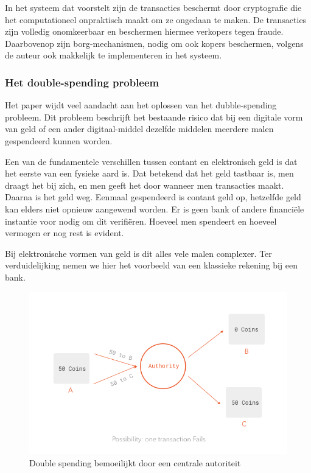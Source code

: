 			In het systeem dat \textcite{Nakamoto2008} voorstelt zijn de transacties beschermt door cryptografie die het computationeel onpraktisch maakt om ze ongedaan te maken. De transacties zijn volledig onomkeerbaar en beschermen hiermee verkopers tegen fraude. Daarbovenop zijn borg-mechanismen, nodig om ook kopers beschermen, volgens de auteur ook makkelijk te implementeren in het systeem.
			
			\subsubsection{Het double-spending probleem}
			Het paper wijdt veel aandacht aan het oplossen van het dubble-spending probleem. Dit probleem beschrijft het bestaande risico dat bij een digitale vorm van geld of een ander digitaal-middel dezelfde middelen meerdere malen gespendeerd kunnen worden.
			
			Een van de fundamentele verschillen tussen contant en elektronisch geld is dat het eerste van een fysieke aard is. Dat betekend dat het geld tastbaar is, men draagt het bij zich, en men geeft het door wanneer men transacties maakt. Daarna is het geld weg. Eenmaal gespendeerd is contant geld op, hetzelfde geld kan elders niet opnieuw aangewend worden. Er is geen bank of andere financiële instantie voor nodig om dit verifiëren. Hoeveel men spendeert en hoeveel vermogen er nog rest is evident. 
			
			Bij elektronische vormen van geld is dit alles vele malen complexer. Ter verduidelijking nemen we hier het voorbeeld van een klassieke rekening bij een bank.
			
			\begin{figure}
				\includegraphics[width=\linewidth]{img/double_spending2.png}
				\caption{Double spending bemoeilijkt door een centrale autoriteit}
				\label{fig:double_spending2}
			\end{figure}
			
